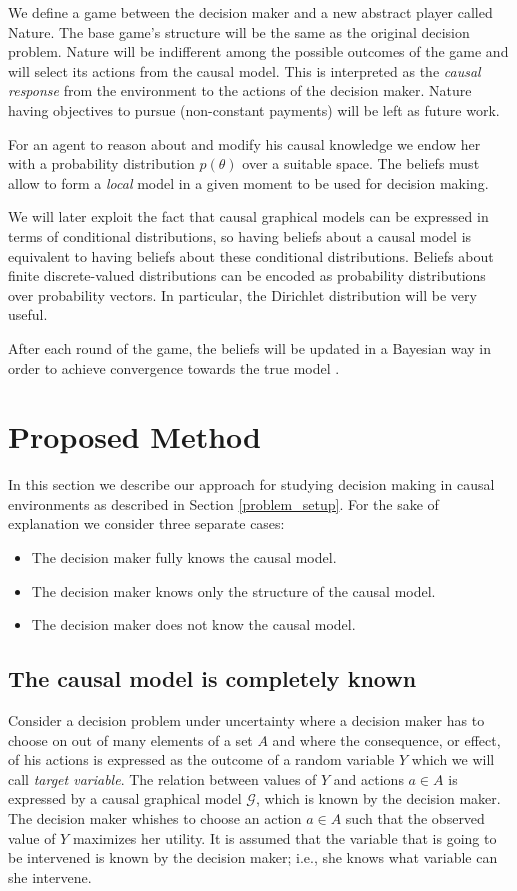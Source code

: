 \documentclass{article}
\begin{document}
We define a game between the decision maker and a new abstract player called Nature. The base game's structure will be the same as the original decision problem. Nature will be indifferent among the possible outcomes of the game and will select its actions from the causal model. This is interpreted as the \textit{causal response} from the environment to the actions of the decision maker. Nature having objectives to pursue (non-constant payments) will be left as future work.

For an agent to reason about and modify his causal knowledge we endow her with a probability distribution $p(\theta)$ over a suitable space. The beliefs must allow to form a \textit{local} model in a given moment to be used for decision making.

We will later exploit the fact that causal graphical models can be expressed in terms of conditional distributions, so having beliefs about a causal model is equivalent to having beliefs about these conditional distributions. Beliefs about finite discrete-valued distributions can be encoded as probability distributions over probability vectors. In particular, the Dirichlet distribution will be very useful.

After each round of the game, the beliefs will be updated in a Bayesian way in order to achieve convergence towards the true model \cite{shoham2008multiagent}.

\section{Proposed Method}
In this section we describe our approach for studying decision making in causal environments as described in Section \ref{problem_setup}. For the sake of explanation we consider three separate cases:

\begin{itemize}
\item The decision maker fully knows the causal model.
\item The decision maker knows only the structure of the causal model.
\item The decision maker does not know the causal model.
\end{itemize}

\subsection{The causal model is completely known}
Consider a decision problem under uncertainty where a decision maker has to choose on out of many elements of a set $A$ and where the consequence, or effect, of his actions is expressed as the outcome of a random variable $Y$ which we will call \textit{target variable}. The relation between values of $Y$ and actions $a \in A$ is expressed by a causal graphical model $\mathcal{G}$, which is known by the decision maker. The decision maker whishes to choose an action $a \in A$ such that the observed value of $Y$ maximizes her utility. It is assumed that the variable that is going to be intervened is known by the decision maker; i.e., she knows what variable can she intervene.
\end{document}
